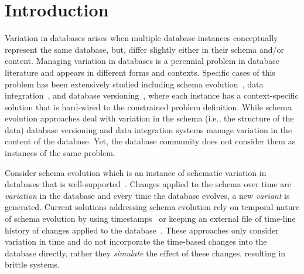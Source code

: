 \section{Introduction}
\label{sec:intro}


\begin{comment}
simple streamline direction:
- variation in db is everywhere
- active research for some instances of it
- other instances aren't well-covered and well-supported
- the combination of instances

a general solution that 
- can model variation for well-covered variation
- others
\end{comment}


Variation in databases arises when multiple database instances 
conceptually represent the same database, but, differ
slightly either in their schema and/or content. 
%
Managing variation in databases is a perennial problem in database literature
and appears in different forms and contexts.
Specific cases of this problem has been extensively studied including 
schema evolution~\cite{SchEvolRA90McKenzie, schVersioning97Castro, 
tempSchEvol91Ariav,prima08Moon}, 
data integration~\cite{dataIntegBook}, 
and database versioning~\cite{datasetVersioning,dbVersioning},
where each instance has a context-specific solution that is hard-wired
to the constrained problem definition. 
%
While schema
evolution approaches deal with variation in the schema (i.e., the structure
of the data) database versioning and data integration systems 
manage variation in the content of the database. Yet, the database
community does not consider them as instances of the same problem.

Consider schema evolution which is an instance of schematic variation in databases
that is well-supported~\cite{SchEvolRA90McKenzie, 
schVersioning97Castro, tempSchEvol91Ariav, tsql95Snodgrass, 
prima08Moon}.
Changes applied to the schema over time are \emph{variation} 
in the database and every time the database evolves, a new
\emph{variant} is generated.
Current solutions addressing schema
evolution rely on temporal nature of schema evolution by using
timestamps~\cite{SchEvolRA90McKenzie, schVersioning97Castro, 
tempSchEvol91Ariav, tsql95Snodgrass} 
or keeping an external file of time-line history of 
changes applied to the database~\cite{prima08Moon}. 
These approaches only consider variation in time and do not
incorporate the time-based changes into
the database directly, rather they \emph{simulate} the effect of these changes,
resulting in brittle systems.

